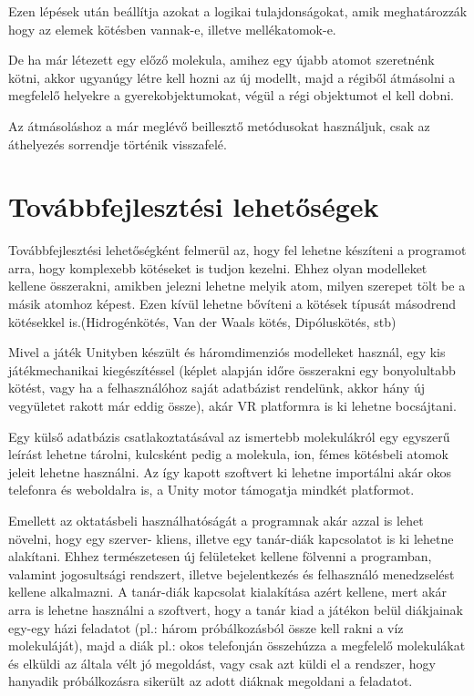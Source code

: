 \documentclass[colorlinks]{thesis-ekf}
\theoremstyle{definition}
\theoremstyle{remark}
\begin{document}
Ezen lépések után beállítja azokat a logikai tulajdonságokat, amik meghatározzák hogy az elemek kötésben vannak-e, illetve mellékatomok-e.

De ha már létezett egy előző molekula, amihez egy újabb atomot szeretnénk kötni, akkor ugyanúgy létre kell hozni az új modellt, majd a régiből átmásolni a megfelelő helyekre a gyerekobjektumokat, végül a régi objektumot el kell dobni.

Az átmásoláshoz a már meglévő beillesztő metódusokat használjuk, csak az áthelyezés sorrendje történik visszafelé.

\chapter{Továbbfejlesztési lehetőségek}
Továbbfejlesztési lehetőségként felmerül az, hogy fel lehetne készíteni a programot arra, hogy komplexebb kötéseket is tudjon kezelni. Ehhez olyan modelleket kellene összerakni, amikben jelezni lehetne melyik atom, milyen szerepet tölt be a másik atomhoz képest. Ezen kívül lehetne bővíteni a kötések típusát másodrend kötésekkel is.(Hidrogénkötés, Van der Waals kötés, Dipóluskötés, stb)

Mivel a játék Unityben készült és háromdimenziós modelleket használ, egy kis játékmechanikai kiegészítéssel (képlet alapján időre összerakni egy bonyolultabb kötést, vagy ha a felhasználóhoz saját adatbázist rendelünk, akkor hány új vegyületet rakott már eddig össze), akár VR platformra is ki lehetne bocsájtani.

Egy külső adatbázis csatlakoztatásával az ismertebb molekulákról egy egyszerű leírást lehetne tárolni, kulcsként pedig a molekula, ion, fémes kötésbeli atomok jeleit lehetne használni. Az így kapott szoftvert ki lehetne importálni akár okos telefonra és weboldalra is, a Unity motor támogatja mindkét platformot.

Emellett az oktatásbeli használhatóságát a programnak akár azzal is lehet növelni, hogy egy szerver- kliens, illetve egy tanár-diák kapcsolatot is ki lehetne alakítani. Ehhez természetesen új felületeket kellene fölvenni a programban, valamint jogosultsági rendszert, illetve bejelentkezés és felhasználó menedzselést kellene alkalmazni. A tanár-diák kapcsolat kialakítása azért kellene, mert akár arra is lehetne használni a szoftvert, hogy a tanár kiad a játékon belül diákjainak egy-egy házi feladatot (pl.: három próbálkozásból össze kell rakni a víz molekuláját), majd a diák pl.: okos telefonján összehúzza a megfelelő molekulákat és elküldi az általa vélt jó megoldást, vagy csak azt küldi el a rendszer, hogy hanyadik próbálkozásra sikerült az adott diáknak megoldani a feladatot. 
\end{document}
